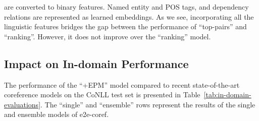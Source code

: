 are converted to binary features. 
Named entity and POS tags, and dependency relations
are represented as learned embeddings.
As we see, incorporating all the linguistic features bridges the gap between the performance of 
``top-pairs'' and ``ranking''.
However, it does not improve over the ``ranking'' model.
\fi
\iffalse
The inclusion of EPM feature-values results in significant improvements.
The F$_1$ gains of ``+EPM'' 
are all statistically significant ($p<0.05$) based on the approximate randomization test \cite{noreen89}.
The results show that linguistic features in which noisy and irrelevant values are discarded
are beneficial for improving the performance of a neural coreference resolver.

For the ``+EPM'' experiments,
the ``top-pairs'' and ``ranking'' models have on-par performance
while ``top-pairs'' uses a simpler objective function and it is used for pretraining the ``ranking'' model.
Henceforth, 
we use the ``top-pairs'' model as the baseline, i.e.\ ``+EPM'' refers to the ``top-pairs'' model with EPM feature-values.
\fi
\subsection{Impact on In-domain Performance}
The performance of the ``+EPM'' model compared to recent state-of-the-art coreference models on the CoNLL test set is presented in Table~\ref{tab:in-domain-evaluations}.
The ``single'' and ``ensemble'' rows represent the results of the single and ensemble models of e2e-coref. 

